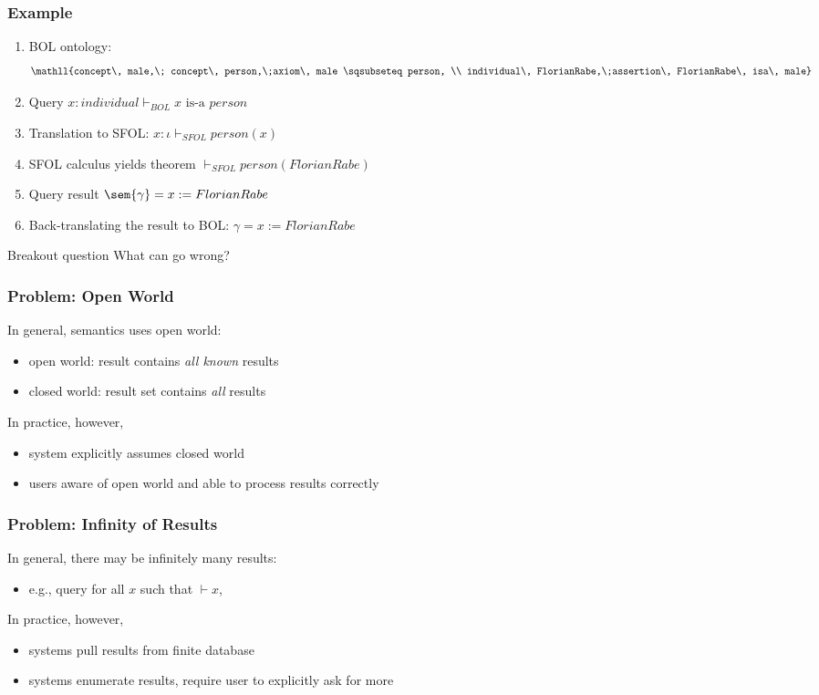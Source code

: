 \begin{frame}\frametitle{Example}
\begin{enumerate}
\item BOL ontology:
\[\mathll{concept\, male,\; concept\, person,\;axiom\, male \sqsubseteq person, \\
  individual\, FlorianRabe,\;assertion\, FlorianRabe\, isa\, male}\]
\item Query $x:individual\vdash_{BOL}x \text{ is-a } person$
\item Translation to SFOL: $x:\iota\vdash_{SFOL} person(x)$
\item SFOL calculus yields theorem $\vdash_{SFOL}person(FlorianRabe)$
\item Query result $\sem{\gamma}= x:= FlorianRabe$
\item Back-translating the result to BOL: $\gamma= x:= FlorianRabe$
\end{enumerate}
\end{frame}

\begin{frame}{Breakout question}
What can go wrong?
\end{frame}

\begin{frame}\frametitle{Problem: Open World}
In general, semantics uses open world:
\begin{itemize}
\item open world: result contains \emph{all known} results
\item closed world: result set contains \emph{all} results
\end{itemize}

In practice, however,
\begin{itemize}
\item system explicitly assumes closed world
\item users aware of open world and able to process results correctly
\end{itemize}
\end{frame}

\begin{frame}\frametitle{Problem: Infinity of Results}
In general, there may be infinitely many results:
\begin{itemize}
\item e.g., query for all $x$ such that $\vdash x$,
\end{itemize}

In practice, however,
\begin{itemize}
\item systems pull results from finite database 
\item systems enumerate results, require user to explicitly ask for more 
\end{itemize}
\end{frame}

